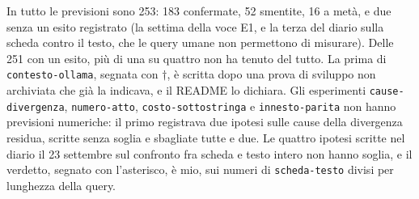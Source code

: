 In tutto le previsioni sono 253: 183 confermate, 52 smentite, 16 a metà, e due
senza un esito registrato (la settima della voce E1, e la terza del diario
sulla scheda contro il testo, che le query umane non permettono di misurare).
Delle 251 con un esito, più di una su quattro non ha tenuto del tutto. La prima di \texttt{contesto-ollama},
segnata con $\dagger$, è scritta dopo una prova di sviluppo non archiviata che
già la indicava, e il README lo dichiara. Gli esperimenti \texttt{cause-divergenza},
\texttt{numero-atto}, \texttt{costo-sottostringa} e \texttt{innesto-parita} non
hanno previsioni numeriche: il primo registrava due ipotesi sulle cause della
divergenza residua, scritte senza soglia e sbagliate tutte e due. Le quattro
ipotesi scritte nel diario il 23 settembre sul confronto fra scheda e testo
intero non hanno soglia, e il verdetto, segnato con l'asterisco, è mio, sui
numeri di \texttt{scheda-testo} divisi per lunghezza della query.
